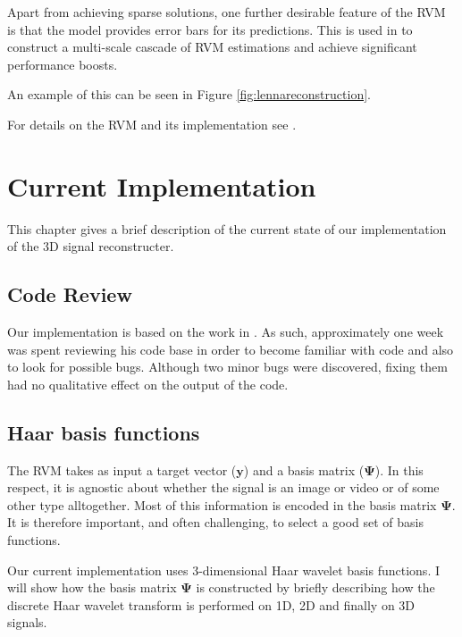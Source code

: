 \documentclass[final,3p]{report}
\let\bs\boldsymbol
\begin{document}
Apart from achieving sparse solutions, one further desirable feature of the RVM is that the model provides error bars for its predictions.
This is used in \cite{pilikos2014} to construct a multi-scale cascade of RVM estimations and achieve significant performance boosts.

An example of this can be seen in Figure \ref{fig:lennareconstruction}.

For details on the RVM and its implementation see \cite{pilikos2014,tipping2003,tipping2001}.


\chapter{Current Implementation}
This chapter gives a brief description of the current state of our implementation of the 3D signal reconstructer.

\section{Code Review}
Our implementation is based on the work in \cite{pilikos2014}.
As such, approximately one week was spent reviewing his code base in order to become familiar with code and also to look for possible bugs.
Although two minor bugs were discovered, fixing them had no qualitative effect on the output of the code.

\section{Haar basis functions}
The RVM takes as input a target vector ($\bs y$) and a basis matrix ($\bs \Psi$). 
In this respect, it is agnostic about whether the signal is an image or video or of some other type alltogether.
Most of this information is encoded in the basis matrix $\bs \Psi$.
It is therefore important, and often challenging, to select a good set of basis functions.

Our current implementation uses 3-dimensional Haar wavelet basis functions.
I will show how the basis matrix $\bs\Psi$ is constructed by briefly describing how the discrete Haar wavelet transform is performed on 1D, 2D and finally on 3D signals.
\end{document}
